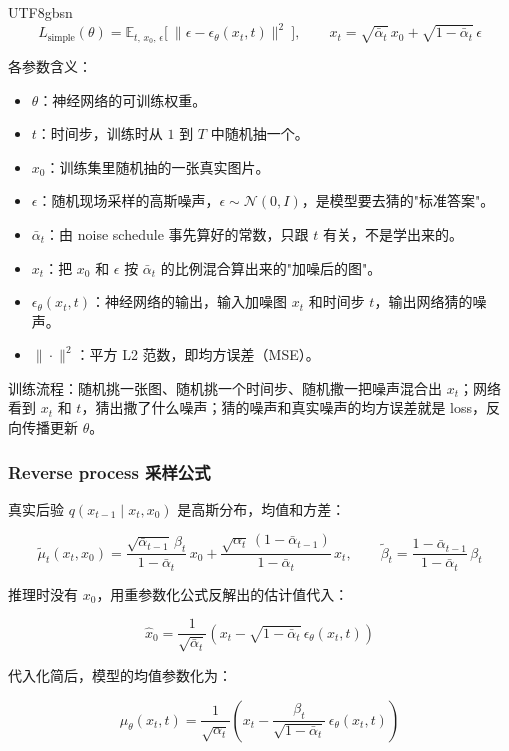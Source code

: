 \documentclass{article}
\begin{document}
\begin{CJK}{UTF8}{gbsn}
\[
L_{\text{simple}}(\theta) = \mathbb{E}_{t,\, x_0,\, \epsilon}\Big[\ \|\epsilon - \epsilon_\theta(x_t, t)\|^2\ \Big], \qquad x_t = \sqrt{\bar\alpha_t}\, x_0 + \sqrt{1-\bar\alpha_t}\, \epsilon
\]

各参数含义：

\begin{itemize}
\item $\theta$：神经网络的可训练权重。
\item $t$：时间步，训练时从 $1$ 到 $T$ 中随机抽一个。
\item $x_0$：训练集里随机抽的一张真实图片。
\item $\epsilon$：随机现场采样的高斯噪声，$\epsilon \sim \mathcal{N}(0, I)$，是模型要去猜的"标准答案"。
\item $\bar\alpha_t$：由 noise schedule 事先算好的常数，只跟 $t$ 有关，不是学出来的。
\item $x_t$：把 $x_0$ 和 $\epsilon$ 按 $\bar\alpha_t$ 的比例混合算出来的"加噪后的图"。
\item $\epsilon_\theta(x_t, t)$：神经网络的输出，输入加噪图 $x_t$ 和时间步 $t$，输出网络猜的噪声。
\item $\|\cdot\|^2$：平方 L2 范数，即均方误差（MSE）。
\end{itemize}

训练流程：随机挑一张图、随机挑一个时间步、随机撒一把噪声混合出 $x_t$；网络看到 $x_t$ 和 $t$，猜出撒了什么噪声；猜的噪声和真实噪声的均方误差就是 loss，反向传播更新 $\theta$。

\subsubsection{Reverse process 采样公式}

真实后验 $q(x_{t-1}\mid x_t, x_0)$ 是高斯分布，均值和方差：

\[
\tilde\mu_t(x_t,x_0) = \frac{\sqrt{\bar\alpha_{t-1}}\,\beta_t}{1-\bar\alpha_t}\, x_0 + \frac{\sqrt{\alpha_t}\,(1-\bar\alpha_{t-1})}{1-\bar\alpha_t}\, x_t, \qquad \tilde\beta_t = \frac{1-\bar\alpha_{t-1}}{1-\bar\alpha_t}\,\beta_t
\]

推理时没有 $x_0$，用重参数化公式反解出的估计值代入：

\[
\hat{x}_0 = \frac{1}{\sqrt{\bar\alpha_t}}\left(x_t - \sqrt{1-\bar\alpha_t}\,\epsilon_\theta(x_t,t)\right)
\]

代入化简后，模型的均值参数化为：

\[
\mu_\theta(x_t, t) = \frac{1}{\sqrt{\alpha_t}}\left(x_t - \frac{\beta_t}{\sqrt{1-\bar\alpha_t}}\, \epsilon_\theta(x_t, t)\right)
\]


\end{CJK}
\end{document}
